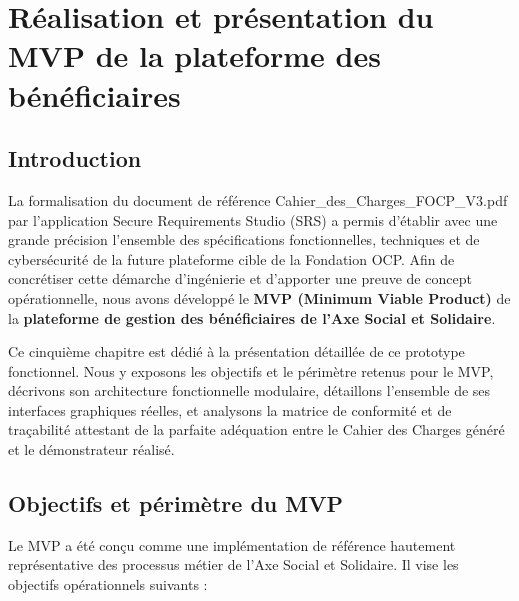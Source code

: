 \chapter{Réalisation et présentation du MVP de la plateforme des bénéficiaires}

\section{Introduction}

La formalisation du document de référence {\ttfamily Cahier\allowbreak\_\allowbreak des\allowbreak\_\allowbreak Charges\allowbreak\_\allowbreak FOCP\allowbreak\_\allowbreak V3.pdf} par l'application Secure Requirements Studio (SRS) a permis d'établir avec une grande précision l'ensemble des spécifications fonctionnelles, techniques et de cybersécurité de la future plateforme cible de la Fondation OCP. Afin de concrétiser cette démarche d'ingénierie et d'apporter une preuve de concept opérationnelle, nous avons développé le \textbf{MVP (Minimum Viable Product)} de la \textbf{plateforme de gestion des bénéficiaires de l'Axe Social et Solidaire}.

Ce cinquième chapitre est dédié à la présentation détaillée de ce prototype fonctionnel. Nous y exposons les objectifs et le périmètre retenus pour le MVP, décrivons son architecture fonctionnelle modulaire, détaillons l'ensemble de ses interfaces graphiques réelles, et analysons la matrice de conformité et de traçabilité attestant de la parfaite adéquation entre le Cahier des Charges généré et le démonstrateur réalisé.

\section{Objectifs et périmètre du MVP}

Le MVP a été conçu comme une implémentation de référence hautement représentative des processus métier de l'Axe Social et Solidaire. Il vise les objectifs opérationnels suivants :

